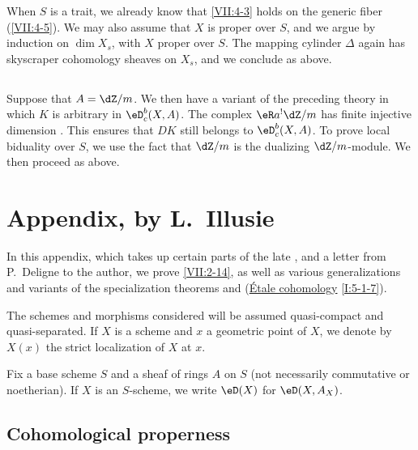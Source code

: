 \documentclass[oneside]{book}
\begin{document}
When $S$ is a trait, we already know that \ref{VII:4-3} holds on the generic
fiber (\ref{VII:4-5}). We may also assume that $X$ is proper over $S$, and we
argue by induction on $\dim{X_s}$, with $X$ proper over $S$. The mapping
cylinder $\Delta$ again has skyscraper cohomology sheaves on $X_s$, and we
conclude as above.





\subsection{}\label{VII:4-7}

Suppose that $A=\dZ/m$. We then have a variant of the preceding theory in
which $K$ is arbitrary in $\eD_c^b(X,A)$. The complex $\eR a^! \dZ/m$ has
finite injective dimension \cite[XVIII 3.1.7]{sga4}. This ensures that $D K$
still belongs to $\eD_c^b(X,A)$. To prove local biduality over $S$, we use the
fact that $\dZ/m$ is the dualizing $\dZ/m$-module. We then proceed as above.










\section{Appendix, by L.\ Illusie}\label{VII:5}

In this appendix, which takes up certain parts of the late
\cite[II]{sga5}, and a letter from P.\ Deligne to the author, we prove
\ref{VII:2-14}, as well as various generalizations and variants of the
specialization theorems \cite[XVI 2.1]{sga4} and
(\hyperref[I]{Étale cohomology} \ref{I:5-1-7}).

The schemes and morphisms considered will be assumed quasi-compact and
quasi-separated. If $X$ is a scheme and $x$ a geometric point of $X$, we
denote by $X(x)$ the strict localization of $X$ at $x$.

Fix a base scheme $S$ and a sheaf of rings $A$ on $S$ (not necessarily
commutative or noetherian). If $X$ is an $S$-scheme, we write $\eD(X)$ for
$\eD(X,A_X)$.





\subsection{Cohomological properness}\label{VII:5-1}
\end{document}
